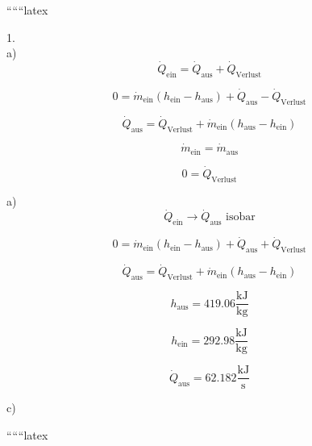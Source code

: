 
``````latex


1. \\
a) \\
\begin{equation*}
\dot{Q}_{\text{ein}} = \dot{Q}_{\text{aus}} + \dot{Q}_{\text{Verlust}}
\end{equation*}

\begin{equation*}
0 = \dot{m}_{\text{ein}} (h_{\text{ein}} - h_{\text{aus}}) + \dot{Q}_{\text{aus}} - \dot{Q}_{\text{Verlust}}
\end{equation*}

\begin{equation*}
\dot{Q}_{\text{aus}} = \dot{Q}_{\text{Verlust}} + \dot{m}_{\text{ein}} (h_{\text{aus}} - h_{\text{ein}})
\end{equation*}

\begin{equation*}
\dot{m}_{\text{ein}} = \dot{m}_{\text{aus}}
\end{equation*}

\begin{equation*}
0 = \dot{Q}_{\text{Verlust}}
\end{equation*}

a) \\
\begin{equation*}
\dot{Q}_{\text{ein}} \rightarrow \dot{Q}_{\text{aus}} \text{ isobar}
\end{equation*}

\begin{equation*}
0 = \dot{m}_{\text{ein}} (h_{\text{ein}} - h_{\text{aus}}) + \dot{Q}_{\text{aus}} + \dot{Q}_{\text{Verlust}}
\end{equation*}

\begin{equation*}
\dot{Q}_{\text{aus}} = \dot{Q}_{\text{Verlust}} + \dot{m}_{\text{ein}} (h_{\text{aus}} - h_{\text{ein}})
\end{equation*}

\begin{equation*}
h_{\text{aus}} = 419.06 \frac{\text{kJ}}{\text{kg}}
\end{equation*}

\begin{equation*}
h_{\text{ein}} = 292.98 \frac{\text{kJ}}{\text{kg}}
\end{equation*}

\begin{equation*}
\dot{Q}_{\text{aus}} = 62.182 \frac{\text{kJ}}{\text{s}}
\end{equation*}

c)

``````latex


